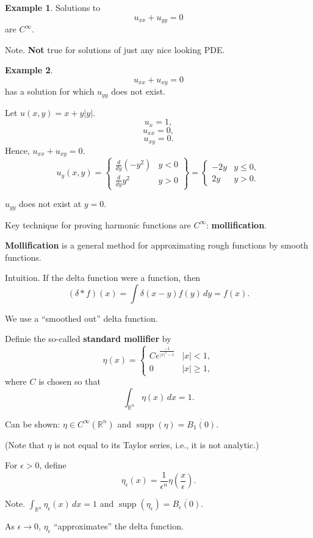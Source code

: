 \documentclass[12pt]{article}
\DeclareMathOperator{\supp}{supp}
\theoremstyle{definition}
\newtheorem*{example*}{Example}
\begin{document}
\begin{example*}
Solutions to
\[u_{xx}+u_{yy}=0\]
are $C^\infty$.

Note. \textbf{Not} true for solutions of just any nice looking PDE.
\end{example*}

\begin{example*}
\[u_{xx}+u_{xy}=0\]
has a solution for which $u_{yy}$ does not exist.

Let $u(x,y)=x+y|y|$.
\[u_x=1,\]
\[u_{xx}=0,\]
\[u_{xy}=0.\]
Hence, $u_{xx}+u_{xy}=0$.
\[u_y(x,y)=\left\{\begin{array}{cc}\frac d{dy}(-y^2)&y<0\\\frac d{dy}y^2&y>0\end{array}\right\}=\left\{\begin{array}{cc}-2y&y\leq0,\\2y&y>0.\end{array}\right.\]

$u_{yy}$ does not exist at $y=0$.
\end{example*}

Key technique for proving harmonic functions are $C^\infty$: \textbf{mollification}.

\textbf{Mollification} is a general method for approximating rough functions by smooth functions.

Intuition. If the delta function were a function, then
\[(\delta*f)(x)=\int\delta(x-y)f(y)\,dy=f(x).\]

We use a ``smoothed out'' delta function.

Definie the so-called \textbf{standard mollifier} by
\[\eta(x)=\left\{\begin{array}{cc}Ce^{\frac{-1}{|x|^2-1}}&|x|<1,\\0&|x|\geq1,\end{array}\right.\]
where $C$ is chosen so that
\[\int_{\mathbb R^n}\eta(x)\,dx=1.\]

Can be shown: $\eta\in C^\infty(\mathbb R^n)$ and $\supp(\eta)=\overline{B_1(0)}$.

(Note that $\eta$ is not equal to its Taylor series, i.e., it is not analytic.)

For $\epsilon>0$, define
\[\eta_\epsilon(x)=\frac1{\epsilon^n}\eta\left(\frac x\epsilon\right).\]

Note. $\int_{\mathbb R^n}\eta_\epsilon(x)\,dx=1$ and $\supp(\eta_\epsilon)=\overline{B_\epsilon(0)}$.

As $\epsilon\to0$, $\eta_\epsilon$ ``approximates'' the delta function.
\end{document}
